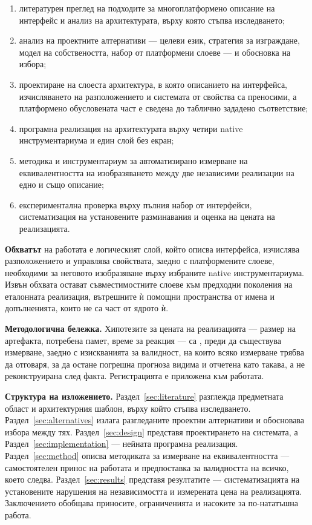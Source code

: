 \begin{enumerate}[topsep=0pt,itemsep=0pt,leftmargin=*]
\item литературен преглед на подходите за многоплатформено описание на интерфейс и
      анализ на архитектурата, върху която стъпва изследването;
\item анализ на проектните алтернативи --- целеви език, стратегия за изграждане, модел
      на собствеността, набор от платформени слоеве --- и обосновка на избора;
\item проектиране на слоеста архитектура, в която описанието на интерфейса,
      изчисляването на разположението и системата от свойства са преносими, а
      платформено обусловената част е сведена до таблично зададено съответствие;
\item програмна реализация на архитектурата върху четири native инструментариума и
      един слой без екран;
\item методика и инструментариум за автоматизирано измерване на еквивалентността на
      изобразяването между две независими реализации на едно и също описание;
\item експериментална проверка върху пълния набор от интерфейси, систематизация на
      установените разминавания и оценка на цената на реализацията.
\end{enumerate}

\textbf{Обхватът} на работата е логическият слой, който описва интерфейса, изчислява
разположението и управлява свойствата, заедно с платформените слоеве, необходими за
неговото изобразяване върху избраните native инструментариума. Извън обхвата остават
съвместимостните слоеве към предходни поколения на еталонната реализация, вътрешните ѝ
помощни пространства от имена и допълненията, които не са част от ядрото ѝ.

\textbf{Методологична бележка.} Хипотезите за цената на реализацията --- размер на
артефакта, потребена памет, време за реакция --- са ,
преди да съществува измерване, заедно с изискванията за валидност, на които всяко
измерване трябва да отговаря, за да остане погрешна прогноза видима и отчетена като
такава, а не реконструирана след факта. Регистрацията е приложена към работата.

\textbf{Структура на изложението.} Раздел~\ref{sec:literature} разглежда предметната
област и архитектурния шаблон, върху който стъпва изследването.
Раздел~\ref{sec:alternatives} излага разгледаните проектни алтернативи и обосновава
избора между тях. Раздел~\ref{sec:design} представя проектирането на системата, а
Раздел~\ref{sec:implementation} --- нейната програмна реализация.
Раздел~\ref{sec:method} описва методиката за измерване на еквивалентността ---
самостоятелен принос на работата и предпоставка за валидността на всичко, което следва.
Раздел~\ref{sec:results} представя резултатите --- систематизацията на установените
нарушения на независимостта и измерената цена на реализацията. Заключението обобщава
приносите, ограниченията и насоките за по-нататъшна работа.
